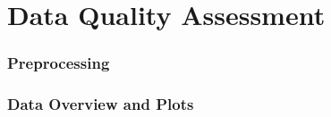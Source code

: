 \chapter{Data Quality Assessment}

\subsection{Preprocessing}

\subsection{Data Overview and Plots}
